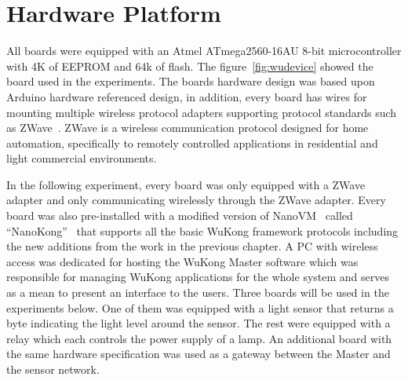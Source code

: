 \section{Hardware Platform}

All boards were equipped with an Atmel ATmega2560-16AU 8-bit microcontroller
with 4K of EEPROM and 64k of flash. The figure~\ref{fig:wudevice} showed the
board used in the experiments. The boards hardware design was based upon Arduino
hardware referenced design, in addition, every board has wires for mounting
multiple wireless protocol adapters supporting protocol standards such as
ZWave~\cite{ZWave}. ZWave is a wireless communication protocol designed for home
automation, specifically to remotely controlled applications in residential and
light commercial environments.

In the following experiment, every board was only equipped with a ZWave adapter
and only communicating wirelessly through the ZWave adapter.  Every board was
also pre-installed with a modified version of NanoVM~\cite{Harbaum2006} called
“NanoKong”~\cite{Su} that supports all the basic WuKong framework protocols
including the new additions from the work in the previous chapter.  A PC with
wireless access was dedicated for hosting the WuKong Master software which was
responsible for managing WuKong applications for the whole system and serves as
a mean to present an interface to the users.  Three boards will be used in the
experiments below. One of them was equipped with a light sensor that returns
a byte indicating the light level around the sensor.  The rest were equipped
with a relay which each controls the power supply of a lamp.  An additional
board with the same hardware specification was used as a gateway between the
Master and the sensor network.

